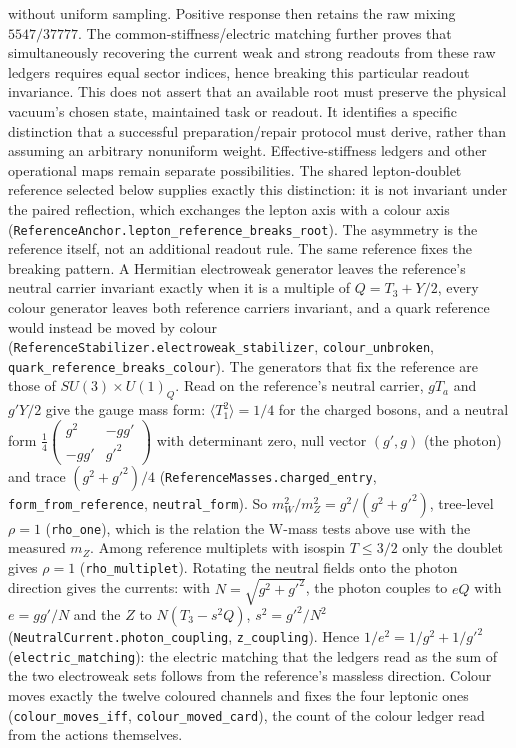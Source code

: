 without uniform sampling. Positive response then retains the raw mixing $5547/37777$. The common-stiffness/electric matching further proves that simultaneously recovering the current weak and strong readouts from these raw ledgers requires equal sector indices, hence breaking this particular readout invariance. This does not assert that an available root must preserve the physical vacuum's chosen state, maintained task or readout. It identifies a specific distinction that a successful preparation/repair protocol must derive, rather than assuming an arbitrary nonuniform weight. Effective-stiffness ledgers and other operational maps remain separate possibilities. The shared lepton-doublet reference selected below supplies exactly this distinction: it is not invariant under the paired reflection, which exchanges the lepton axis with a colour axis (\texttt{ReferenceAnchor.lepton\_reference\_breaks\_root}). The asymmetry is the reference itself, not an additional readout rule. The same reference fixes the breaking pattern. A Hermitian electroweak generator leaves the reference's neutral carrier invariant exactly when it is a multiple of $Q=T_3+Y/2$, every colour generator leaves both reference carriers invariant, and a quark reference would instead be moved by colour (\texttt{ReferenceStabilizer.electroweak\_stabilizer}, \texttt{colour\_unbroken}, \texttt{quark\_reference\_breaks\_colour}). The generators that fix the reference are those of $SU(3)\times U(1)_Q$. Read on the reference's neutral carrier, $gT_a$ and $g'Y/2$ give the gauge mass form: $\langle T_1^2\rangle=1/4$ for the charged bosons, and a neutral form $\tfrac14\left(\begin{smallmatrix}g^2&-gg'\\-gg'&g'^2\end{smallmatrix}\right)$ with determinant zero, null vector $(g',g)$ (the photon) and trace $(g^2+g'^2)/4$ (\texttt{ReferenceMasses.charged\_entry}, \texttt{form\_from\_reference}, \texttt{neutral\_form}). So $m_W^2/m_Z^2=g^2/(g^2+g'^2)$, tree-level $\rho=1$ (\texttt{rho\_one}), which is the relation the W-mass tests above use with the measured $m_Z$. Among reference multiplets with isospin $T\le3/2$ only the doublet gives $\rho=1$ (\texttt{rho\_multiplet}). Rotating the neutral fields onto the photon direction gives the currents: with $N=\sqrt{g^2+g'^2}$, the photon couples to $eQ$ with $e=gg'/N$ and the $Z$ to $N(T_3-s^2Q)$, $s^2=g'^2/N^2$ (\texttt{NeutralCurrent.photon\_coupling}, \texttt{z\_coupling}). Hence $1/e^2=1/g^2+1/g'^2$ (\texttt{electric\_matching}): the electric matching that the ledgers read as the sum of the two electroweak sets follows from the reference's massless direction. Colour moves exactly the twelve coloured channels and fixes the four leptonic ones (\texttt{colour\_moves\_iff}, \texttt{colour\_moved\_card}), the count of the colour ledger read from the actions themselves.

